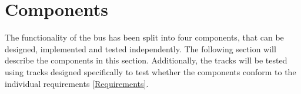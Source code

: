 \section{Components}
The functionality of the bus has been split into four components, that can be designed, implemented and tested independently. The following section will describe the components in this section. Additionally, the tracks will be tested using tracks designed specifically to test whether the components conform to the individual requirements \ref{Requirements}.









